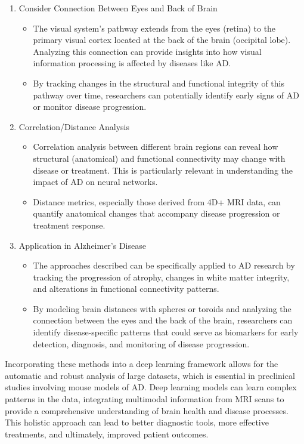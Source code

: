 \documentclass[twocolumn]{article}
\begin{document}
\begin{enumerate}
\begin{itemize}
\end{itemize}
\item Consider Connection Between Eyes and Back of Brain
\begin{itemize}
    \item The visual system's pathway extends from the eyes (retina) to the primary visual cortex located at the back of the brain (occipital lobe). Analyzing this connection can provide insights into how visual information processing is affected by diseases like AD.
    \item By tracking changes in the structural and functional integrity of this pathway over time, researchers can potentially identify early signs of AD or monitor disease progression.
\end{itemize}
\item Correlation/Distance Analysis
\begin{itemize}
    \item Correlation analysis between different brain regions can reveal how structural (anatomical) and functional connectivity may change with disease or treatment. This is particularly relevant in understanding the impact of AD on neural networks.
    \item Distance metrics, especially those derived from 4D+ MRI data, can quantify anatomical changes that accompany disease progression or treatment response.
\end{itemize}
\item Application in Alzheimer's Disease
\begin{itemize}
    \item The approaches described can be specifically applied to AD research by tracking the progression of atrophy, changes in white matter integrity, and alterations in functional connectivity patterns.
    \item By modeling brain distances with spheres or toroids and analyzing the connection between the eyes and the back of the brain, researchers can identify disease-specific patterns that could serve as biomarkers for early detection, diagnosis, and monitoring of disease progression.
\end{itemize}
\end{enumerate}

Incorporating these methods into a deep learning framework allows for the automatic and robust analysis of large datasets, which is essential in preclinical studies involving mouse models of AD. Deep learning models can learn complex patterns in the data, integrating multimodal information from MRI scans to provide a comprehensive understanding of brain health and disease processes. This holistic approach can lead to better diagnostic tools, more effective treatments, and ultimately, improved patient outcomes.
\end{document}
